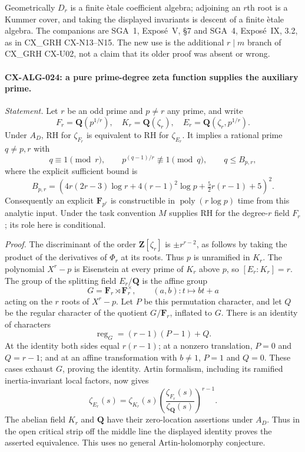 \documentclass[11pt,a4paper]{article}
\begin{document}
Geometrically $D_r$ is a finite \`etale coefficient algebra; adjoining
an $r$th root is a Kummer cover, and taking the displayed invariants
is descent of a finite \`etale algebra. The companions are SGA~1,
Expos\'e~V, \S7 and SGA~4, Expos\'e~IX, 3.2, as in CX\_GRH
CX-N13--N15. The new use is the additional $r\mid m$ branch of
CX\_GRH CX-U02, not a claim that its older proof was absent or wrong.

\paragraph{CX-ALG-024: a pure prime-degree zeta function supplies the auxiliary prime.}
\emph{Statement.} Let $r$ be an odd prime and $p\ne r$ any prime, and write
\[
 F_r=\mathbf Q(p^{1/r}),\quad K_r=\mathbf Q(\zeta_r),\quad
 E_r=\mathbf Q(\zeta_r,p^{1/r}).
\]
Under $A_D$, RH for $\zeta_{F_r}$ is equivalent to RH for
$\zeta_{E_r}$. It implies a rational prime $q\ne p,r$ with
\[
 q\equiv1\pmod r,\qquad p^{(q-1)/r}\not\equiv1\pmod q,
 \qquad q\le B_{p,r},
\]
where the explicit sufficient bound is
\[
 B_{p,r}=
 \left(4r(2r-3)\log r+4(r-1)^2\log p
                       +\tfrac52r(r-1)+5\right)^2.
\]
Consequently an explicit $\mathbf F_{p^r}$ is constructible in
$\operatorname{poly}(r\log p)$ time from this analytic input.
Under the task convention $M$ supplies RH for the degree-$r$ field
$F_r$; its role here is conditional.

\emph{Proof.} The discriminant of the order $\mathbf Z[\zeta_r]$ is
$\pm r^{r-2}$, as follows by taking the product of the derivatives
of $\Phi_r$ at its roots. Thus $p$ is unramified in $K_r$.
The polynomial $X^r-p$ is Eisenstein at every prime of $K_r$ above $p$,
so $[E_r:K_r]=r$. The group of the splitting field $E_r/\mathbf Q$
is the affine group
\[
             G=\mathbf F_r\rtimes\mathbf F_r^\times,
       \qquad (a,b):t\longmapsto bt+a
\]
acting on the $r$ roots of $X^r-p$.
Let $P$ be this permutation character, and let $Q$ be the regular
character of the quotient $G/\mathbf F_r$, inflated to $G$.
There is an identity of characters
\[
                    \operatorname{reg}_G=(r-1)(P-1)+Q.
\]
At the identity both sides equal $r(r-1)$; at a nonzero translation,
$P=0$ and $Q=r-1$; and at an affine transformation with $b\ne1$,
$P=1$ and $Q=0$. These cases exhaust $G$, proving the identity.
Artin formalism, including its ramified inertia-invariant local factors,
now gives
\[
          \zeta_{E_r}(s)=\zeta_{K_r}(s)
                    \left(\frac{\zeta_{F_r}(s)}{\zeta_{\mathbf Q}(s)}
                    \right)^{r-1}.
\]
The abelian field $K_r$ and $\mathbf Q$ have their zero-location
assertions under $A_D$. Thus in the open critical strip off the middle
line the displayed identity proves the asserted equivalence. This uses
no general Artin-holomorphy conjecture.
\end{document}
